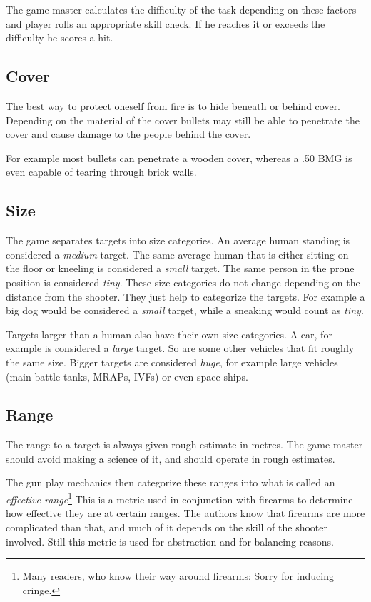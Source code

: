 The game master calculates the difficulty of the task depending on these factors
and player rolls an appropriate skill check. If he reaches it or exceeds the
difficulty he scores a hit.

\subsection{Cover}
\label{sub:7-Cover}

The best way to protect oneself from fire is to hide beneath or behind cover.
Depending on the material of the cover bullets may still be able to penetrate
the cover and cause damage to the people behind the cover.

For example most bullets can penetrate a wooden cover, whereas a .50 BMG is even
capable of tearing through brick walls.

\subsection{Size}
\label{sub:7-Size}

The game separates targets into size categories. An average human standing is
considered a \emph{medium} target. The same average human that is either sitting
on the floor or kneeling is considered a \emph{small} target. The same person
in the prone position is considered \emph{tiny}. These size categories do not
change depending on the distance from the shooter. They just help to categorize
the targets. For example a big dog would be considered a \emph{small} target,
while a sneaking would count as \emph{tiny}.

Targets larger than a human also have their own size categories. A car, for
example is considered a \emph{large} target. So are some other vehicles that
fit roughly the same size. Bigger targets are considered \emph{huge}, for
example large vehicles (main battle tanks, MRAPs, IVFs) or even space ships.

\subsection{Range}
\label{sub:7-Range}

The range to a target is always given rough estimate in metres. The game master
should avoid making a science of it, and should operate in rough estimates.

The gun play mechanics then categorize these ranges into what is called an
\emph{effective range}\footnote{Many readers, who know their way around
  firearms: Sorry for inducing cringe.} This is a metric used in conjunction
with firearms to determine how effective they are at certain ranges. The authors
know that firearms are more complicated than that, and much of it depends on the
skill of the shooter involved. Still this metric is used for abstraction and for
balancing reasons.

